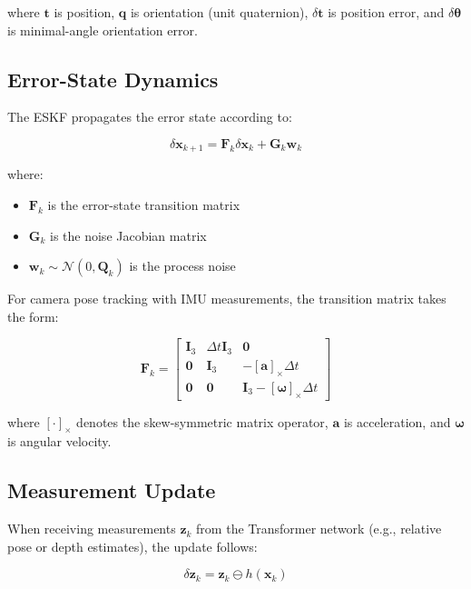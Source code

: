 where $\mathbf{t}$ is position, $\mathbf{q}$ is orientation (unit quaternion), $\delta\mathbf{t}$ is position error, and $\delta\boldsymbol{\theta}$ is minimal-angle orientation error.

\subsection{Error-State Dynamics}
The ESKF propagates the error state according to:

\begin{equation}
	\delta\mathbf{x}_{k+1} = \mathbf{F}_k\delta\mathbf{x}_k + \mathbf{G}_k\mathbf{w}_k
\end{equation}

where:
\begin{itemize}
	\item $\mathbf{F}_k$ is the error-state transition matrix
	\item $\mathbf{G}_k$ is the noise Jacobian matrix
	\item $\mathbf{w}_k \sim \mathcal{N}(0,\mathbf{Q}_k)$ is the process noise
\end{itemize}

For camera pose tracking with IMU measurements, the transition matrix takes the form:

\begin{equation}
	\mathbf{F}_k = \begin{bmatrix}
		\mathbf{I}_3 & \Delta t\mathbf{I}_3 & \mathbf{0} \\
		\mathbf{0} & \mathbf{I}_3 & -[\mathbf{a}]_\times\Delta t \\
		\mathbf{0} & \mathbf{0} & \mathbf{I}_3 - [\boldsymbol{\omega}]_\times\Delta t
	\end{bmatrix}
\end{equation}

where $[\cdot]_\times$ denotes the skew-symmetric matrix operator, $\mathbf{a}$ is acceleration, and $\boldsymbol{\omega}$ is angular velocity.

\subsection{Measurement Update}
When receiving measurements $\mathbf{z}_k$ from the Transformer network (e.g., relative pose or depth estimates), the update follows:

\begin{equation}
	\delta\mathbf{z}_k = \mathbf{z}_k \ominus h(\mathbf{x}_k)
\end{equation}

